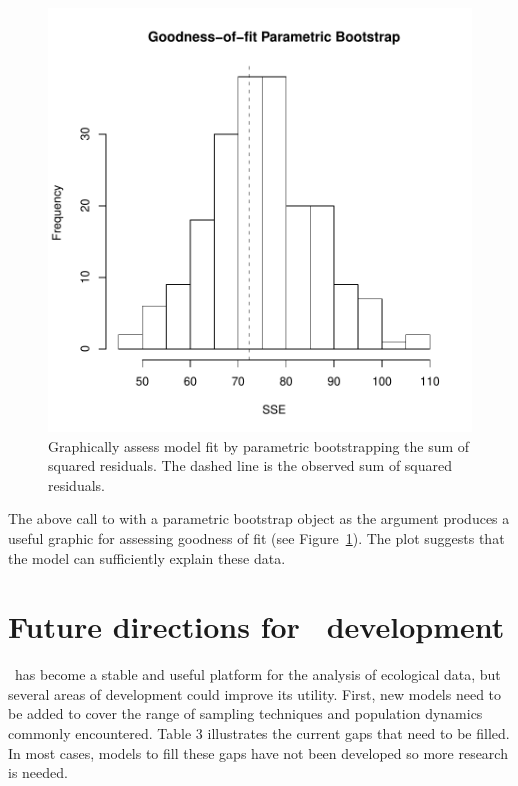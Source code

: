 \documentclass[article,shortnames]{jss}
\newcommand{\um}{\pkg{unmarked}}
\begin{document}
\begin{figure}[h!]
  \centering
\includegraphics{unmarked-034}
\caption{Graphically assess model fit by parametric bootstrapping
  the sum of squared residuals.  The dashed line is the observed sum
  of squared residuals.}
\label{fig:pb}
\end{figure}


The above call to  with a parametric bootstrap object as
the argument produces a useful graphic for assessing goodness of fit
(see Figure~\ref{fig:pb}).  The plot suggests that the model can sufficiently
explain these data.


\section[Future directions for unmarked development]{Future directions for \um\ development}
\label{sec:future-direct-unmark}

\um\ has become a stable and useful platform for the analysis of ecological data, but several areas of development could improve its utility.  First, new models need to be added to cover the range of sampling techniques and population dynamics commonly encountered. Table 3 illustrates the current gaps that need to be filled. In most cases, models to fill these gaps have not been developed so more research is needed.  
\end{document}
